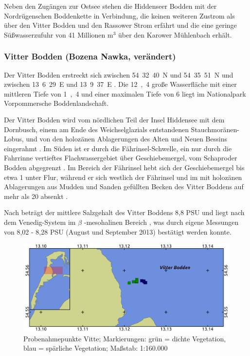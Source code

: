 Neben den Zugängen zur Ostsee stehen die Hiddenseer Bodden mit der Nordrügenschen Boddenkette in Verbindung, die keinen weiteren Zustrom als über den Vitter Bodden und den Rassower Strom erfährt und die eine geringe Süßwasserzufuhr von 41 Millionen m$^3$ über den Karower Mühlenbach erhält.



\subsubsection{Vitter Bodden (Bozena Nawka, verändert)}


Der Vitter Bodden erstreckt sich zwischen 54\textdegree\ 32\textquotesingle\ 40\dq\ N und 54\textdegree\ 35\textquotesingle\ 51\dq\ N und zwischen 13\textdegree\ 6\textquotesingle\ 29\dq\ E und 13\textdegree\ 9\textquotesingle\ 37\dq\ E \citep{nathansen_2014}. Die \unit{12,4}{\kilo\metre\squared} große Wasserfläche mit einer mittleren Tiefe von \unit{1,4}{\metre} \citep{correns_1976} und einer maximalen Tiefe von \unit{6}{\metre} \citep{biele_1997} liegt im Nationalpark Vorpommersche Boddenlandschaft.

Der Vitter Bodden wird vom nördlichen Teil der Insel Hiddensee mit dem Dornbusch, einem am Ende des Weichselglazials entstandenen Stauchmoränen-Lobus, und von den holozänen Ablagerungen des Alten und Neuen Bessins eingerahmt \citep{katzung_2004}.
Im Süden ist er durch die Fährinsel-Schwelle, ein nur durch die Fahrrinne vertieftes Flachwassergebiet über Geschiebemergel, vom Schaproder Bodden abgegrenzt \citep{mobus_2001}. Im Bereich der Fährinsel hebt sich der Geschiebemergel bis etwa \unit{1}{\metre} unter Flur, während er sich westlich der Fährinsel und im mit holozänen Ablagerungen aus Mudden und Sanden gefüllten Becken des Vitter Boddens auf mehr als \unit{20}{\metre} absenkt \citep{mobus_2001}.

Nach \cite{bachor_2005} beträgt der mittlere Salzgehalt des Vitter Boddens 8,8 PSU und liegt nach dem Venedig-System im $\beta$ -mesohalinen Bereich \citep{gosselck_2011}, was durch eigene Messungen von 8,02 - 8,28 PSU (August und September 2013) bestätigt werden konnte. 

\begin{figure}[htb]
\centering
\includegraphics[width=1\textwidth]{images/Vitte}
\caption[Probenahmepunkte Vitte]{Probenahmepunkte Vitte; Markierungen: grün = dichte Vegetation, blau = spärliche Vegetation; Maßstab: 1:160.000}
\label{Vitte}
\end{figure}


